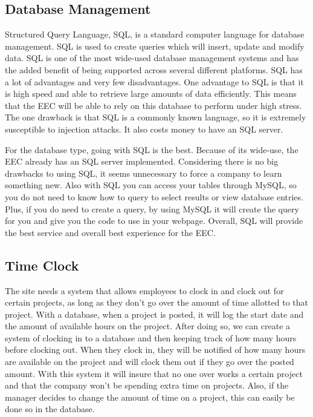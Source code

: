 \documentclass[letterpaper,10pt,titlepage,journal,compsoc,draftclsnofoot,onecolumn]{IEEEtran}
\begin{document}
\subsection{Database Management}

\par Structured Query Language, SQL, is a standard computer language for database management. SQL is used to create queries which will insert, update and modify data. SQL is one of the most wide-used database management systems and has the added benefit of being supported across several different platforms. SQL has a lot of advantages and very few disadvantages. One advantage to SQL is that it is high speed and able to retrieve large amounts of data efficiently. This means that the EEC will be able to rely on this database to perform under high stress. The one drawback is that SQL is a commonly known language, so it is extremely susceptible to injection attacks. It also costs money to have an SQL server.\newline
\par For the database type, going with SQL is the best. Because of its wide-use, the EEC already has an SQL server implemented. Considering there is no big drawbacks to using SQL, it seems unnecessary to force a company to learn something new. Also with SQL you can access your tables through MySQL, so you do not need to know how to query to select results or view database entries. Plus, if you do need to create a query, by using MySQL it will create the query for you and give you the code to use in your webpage. Overall, SQL will provide the best service and overall best experience for the EEC. 

\subsection{Time Clock}

\par The site needs a system that allows employees to clock in and clock out for certain projects, as long as they don’t go over the amount of time allotted to that project. With a database, when a project is posted, it will log the start date and the amount of available hours on the project. After doing so, we can create a system of clocking in to a database and then keeping track of how many hours before clocking out. When they clock in, they will be notified of how many hours are available on the project and will clock them out if they go over the posted amount. With this system it will insure that no one over works a certain project and that the company won’t be spending extra time on projects. Also, if the manager decides to change the amount of time on a project, this can easily be done so in the database. \newline
\end{document}
